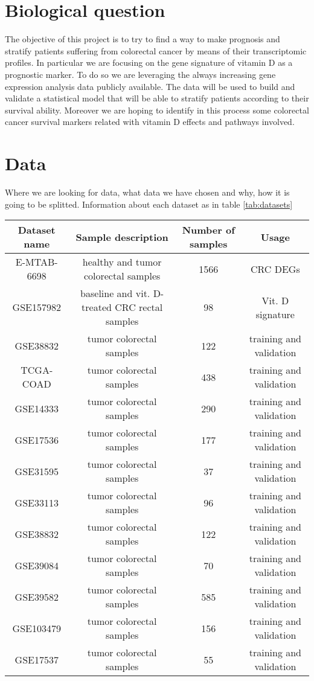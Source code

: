 \documentclass[fleqn,10pt]{SelfArx} %
\begin{document}

\section{Biological question}
The objective of this project is to try to find a way to make prognosis and stratify patients suffering from colorectal cancer by means of their transcriptomic profiles.
In particular we are focusing on the gene signature of vitamin D as a prognostic marker.
To do so we are leveraging the always increasing gene expression analysis data publicly available.
The data will be used to build and validate a statistical model that will be able to stratify patients according to their survival ability.
Moreover we are hoping to identify in this process some colorectal cancer survival markers related with vitamin D effects and pathways involved.


\section{Data}
Where we are looking for data, what data we have chosen and why, how it is going to be splitted.
Information about each dataset as in table \ref{tab:datasets}

\begin{table*}[ht]
	\centering
	\begin{tabular}{cccc}
		\hline
		Dataset name & Sample description & Number of samples & Usage \\
		\hline
		E-MTAB-6698	& healthy and tumor colorectal samples	&1566	&CRC DEGs\\
		GSE157982	&baseline and vit. D-treated CRC rectal samples	&98&	Vit. D signature\\
		GSE38832	&tumor colorectal samples	&122&	training and validation\\
		TCGA-COAD	&tumor colorectal samples	&438&	training and validation		\\
		GSE14333	&tumor colorectal samples	&290&	training and validation\\
		GSE17536	&tumor colorectal samples	&177&	training and validation	\\
		GSE31595	&tumor colorectal samples	&37	&training and validation	\\
		GSE33113	&tumor colorectal samples	&96	&training and validation	\\
		GSE38832	&tumor colorectal samples	&122&	training and validation	\\
		GSE39084	&tumor colorectal samples	&70	&training and validation	\\
		GSE39582	&tumor colorectal samples	&585&	training and validation	\\
		GSE103479	&tumor colorectal samples	&156&	training and validation	\\
		GSE17537	&tumor colorectal samples	&55	&training and validation	\\
		\hline
	\end{tabular}
	\caption{Datasets used}
	\label{tab:datasets}
\end{table*}
\end{document}
